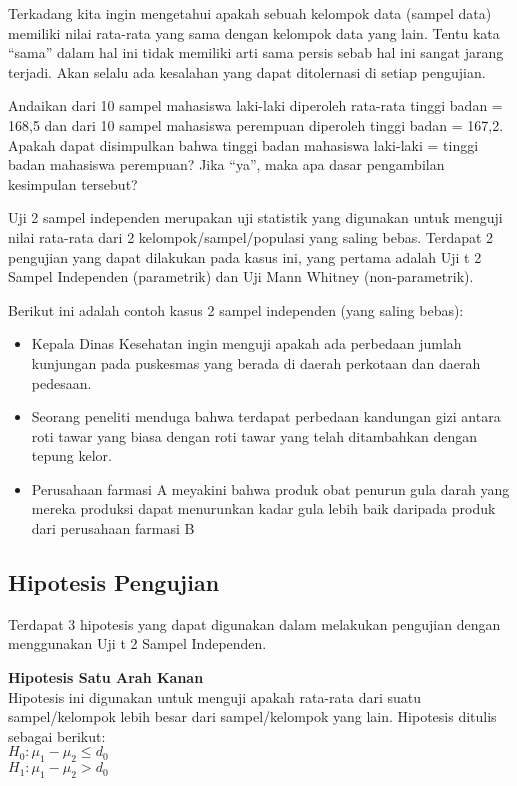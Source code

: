 \documentclass[
]{book}
\providecommand{\tightlist}{%
  \setlength{\itemsep}{0pt}\setlength{\parskip}{0pt}}
\begin{document}
Terkadang kita ingin mengetahui apakah sebuah kelompok data (sampel data) memiliki nilai rata-rata yang sama dengan kelompok data yang lain. Tentu kata ``sama'' dalam hal ini tidak memiliki arti sama persis sebab hal ini sangat jarang terjadi. Akan selalu ada kesalahan yang dapat ditolernasi di setiap pengujian.

Andaikan dari 10 sampel mahasiswa laki-laki diperoleh rata-rata tinggi badan = 168,5 dan dari 10 sampel mahasiswa perempuan diperoleh tinggi badan = 167,2. Apakah dapat disimpulkan bahwa tinggi badan mahasiswa laki-laki = tinggi badan mahasiswa perempuan? Jika ``ya'', maka apa dasar pengambilan kesimpulan tersebut?

Uji 2 sampel independen merupakan uji statistik yang digunakan untuk menguji nilai rata-rata dari 2 kelompok/sampel/populasi yang saling bebas. Terdapat 2 pengujian yang dapat dilakukan pada kasus ini, yang pertama adalah Uji t 2 Sampel Independen (parametrik) dan Uji Mann Whitney (non-parametrik).

Berikut ini adalah contoh kasus 2 sampel independen (yang saling bebas):

\begin{itemize}
\tightlist
\item
  Kepala Dinas Kesehatan ingin menguji apakah ada perbedaan jumlah kunjungan pada puskesmas yang berada di daerah perkotaan dan daerah pedesaan.
\item
  Seorang peneliti menduga bahwa terdapat perbedaan kandungan gizi antara roti tawar yang biasa dengan roti tawar yang telah ditambahkan dengan tepung kelor.
\item
  Perusahaan farmasi A meyakini bahwa produk obat penurun gula darah yang mereka produksi dapat menurunkan kadar gula lebih baik daripada produk dari perusahaan farmasi B
\end{itemize}

\hypertarget{hipotesis-pengujian}{%
\subsection{Hipotesis Pengujian}\label{hipotesis-pengujian}}

Terdapat 3 hipotesis yang dapat digunakan dalam melakukan pengujian dengan menggunakan Uji t 2 Sampel Independen.

\textbf{Hipotesis Satu Arah Kanan}\\
Hipotesis ini digunakan untuk menguji apakah rata-rata dari suatu sampel/kelompok lebih besar dari sampel/kelompok yang lain. Hipotesis ditulis sebagai berikut:\\
\(H_0 : \mu_1-\mu_2 \leq d_0\)\\
\(H_1 : \mu_1-\mu_2 > d_0\)
\end{document}
